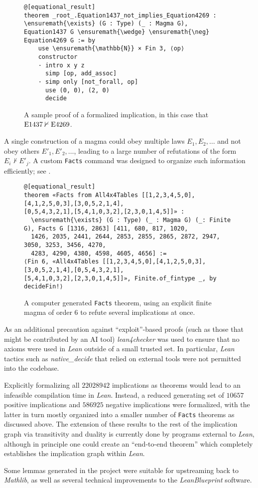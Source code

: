 \begin{figure}
\centering
\begin{Verbatim}
@[equational_result]
theorem _root_.Equation1437_not_implies_Equation4269 : \ensuremath{\exists} (G : Type) (_ : Magma G),
Equation1437 G \ensuremath{\wedge} \ensuremath{\neg} Equation4269 G := by
    use \ensuremath{\mathbb{N}} × Fin 3, ⟨op⟩
    constructor
    · intro x y z
      simp [op, add_assoc]
    · simp only [not_forall, op]
      use (0, 0), (2, 0)
      decide
\end{Verbatim}
\caption{A sample proof of a formalized implication, in this case that $\mathrm{E}1437 \nvdash \mathrm{E}4269$.}
\label{fig:impl}
\end{figure}

A single construction of a magma could obey multiple laws $E_1,E_2,\dots$ and not obey others $E'_1, E'_2, \dots$, leading to a large number of refutations of the form $E_i \nvdash E'_j$.  A custom \texttt{Facts} command was designed to organize such information efficiently; see .

\begin{figure}
\centering
\begin{Verbatim}
@[equational_result]
theorem «Facts from All4x4Tables [[1,2,3,4,5,0],[4,1,2,5,0,3],[3,0,5,2,1,4],
[0,5,4,3,2,1],[5,4,1,0,3,2],[2,3,0,1,4,5]]» :
  \ensuremath{\exists} (G : Type) (_ : Magma G) (_: Finite G), Facts G [1316, 2863] [411, 680, 817, 1020,
  1426, 2035, 2441, 2644, 2853, 2855, 2865, 2872, 2947, 3050, 3253, 3456, 4270,
  4283, 4290, 4380, 4598, 4605, 4656] :=
⟨Fin 6, «All4x4Tables [[1,2,3,4,5,0],[4,1,2,5,0,3],[3,0,5,2,1,4],[0,5,4,3,2,1],
[5,4,1,0,3,2],[2,3,0,1,4,5]]», Finite.of_fintype _, by decideFin!⟩
\end{Verbatim}
\caption{A computer generated \texttt{Facts} theorem, using an explicit finite magma of order $6$ to refute several implications at once.}
\label{fig:facts}
\end{figure}

As an additional precaution against ``exploit''-based proofs (such as those that might be contributed by an AI tool) \emph{lean4checker} was used to ensure that no axioms were used in \emph{Lean} outside of a small trusted set.  In particular, \emph{Lean} tactics such as \emph{native\_decide} that relied on external tools were not permitted into the codebase. 

Explicitly formalizing all $\num{22028942}$ implications as theorems would lead to an infeasible compilation time in  \emph{Lean}.  Instead, a reduced generating set of $\num{10657}$ positive implications and $\num{586925}$ negative implications were formalized, with the latter in turn mostly organized into a smaller number of \texttt{Facts} theorems as discussed above.  The extension of these results to the rest of the implication graph via transitivity and duality is currently done by programs external to \emph{Lean}, although in principle one could create an ``end-to-end theorem'' which completely establishes the implication graph within \emph{Lean}.

Some lemmas generated in the project were suitable for upstreaming back to \emph{Mathlib}, as well as several technical improvements to the \emph{LeanBlueprint} software.
